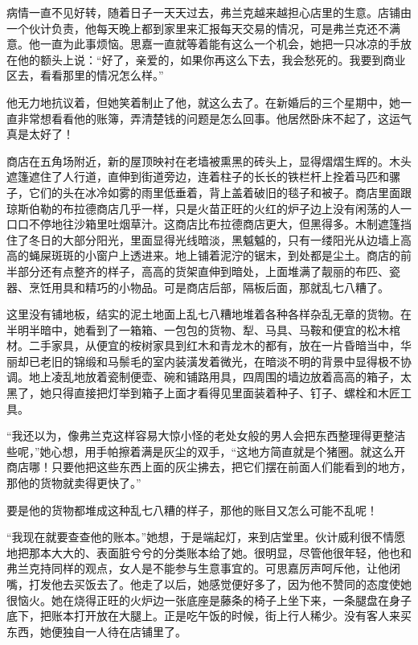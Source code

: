 \par 病情一直不见好转，随着日子一天天过去，弗兰克越来越担心店里的生意。店铺由一个伙计负责，他每天晚上都到家里来汇报每天交易的情况，可是弗兰克还不满意。他一直为此事烦恼。思嘉一直就等着能有这么一个机会，她把一只冰凉的手放在他的额头上说：“好了，亲爱的，如果你再这么下去，我会愁死的。我要到商业区去，看看那里的情况怎么样。”
\par 他无力地抗议着，但她笑着制止了他，就这么去了。在新婚后的三个星期中，她一直非常想看看他的账簿，弄清楚钱的问题是怎么回事。他居然卧床不起了，这运气真是太好了！
\par 商店在五角场附近，新的屋顶映衬在老墙被熏黑的砖头上，显得熠熠生辉的。木头遮篷遮住了人行道，直伸到街道旁边，连着柱子的长长的铁栏杆上拴着马匹和骡子，它们的头在冰冷如雾的雨里低垂着，背上盖着破旧的毯子和被子。商店里面跟琼斯伯勒的布拉德商店几乎一样，只是火苗正旺的火红的炉子边上没有闲荡的人一口口不停地往沙箱里吐烟草汁。这商店比布拉德商店更大，但黑得多。木制遮篷挡住了冬日的大部分阳光，里面显得光线暗淡，黑魆魆的，只有一缕阳光从边墙上高高的蝇屎斑斑的小窗户上透进来。地上铺着泥泞的锯末，到处都是尘土。商店的前半部分还有点整齐的样子，高高的货架直伸到暗处，上面堆满了靓丽的布匹、瓷器、烹饪用具和精巧的小物品。可是商店后部，隔板后面，那就乱七八糟了。
\par 这里没有铺地板，结实的泥土地面上乱七八糟地堆着各种各样杂乱无章的货物。在半明半暗中，她看到了一箱箱、一包包的货物、犁、马具、马鞍和便宜的松木棺材。二手家具，从便宜的桉树家具到红木和青龙木的都有，放在一片昏暗当中，华丽却已老旧的锦缎和马鬃毛的室内装潢发着微光，在暗淡不明的背景中显得极不协调。地上凌乱地放着瓷制便壶、碗和铺路用具，四周围的墙边放着高高的箱子，太黑了，她只得直接把灯举到箱子上面才看得见里面装着种子、钉子、螺栓和木匠工具。
\par “我还以为，像弗兰克这样容易大惊小怪的老处女般的男人会把东西整理得更整洁些呢，”她心想，用手帕擦着满是灰尘的双手，“这地方简直就是个猪圈。就这么开商店哪！只要他把这些东西上面的灰尘拂去，把它们摆在前面人们能看到的地方，那他的货物就卖得更快了。”
\par 要是他的货物都堆成这种乱七八糟的样子，那他的账目又怎么可能不乱呢！
\par “我现在就要查查他的账本。”她想，于是端起灯，来到店堂里。伙计威利很不情愿地把那本大大的、表面脏兮兮的分类账本给了她。很明显，尽管他很年轻，他也和弗兰克持同样的观点，女人是不能参与生意事宜的。可思嘉厉声呵斥他，让他闭嘴，打发他去买饭去了。他走了以后，她感觉便好多了，因为他不赞同的态度使她很恼火。她在烧得正旺的火炉边一张底座是藤条的椅子上坐下来，一条腿盘在身子底下，把账本打开放在大腿上。正是吃午饭的时候，街上行人稀少。没有客人来买东西，她便独自一人待在店铺里了。
